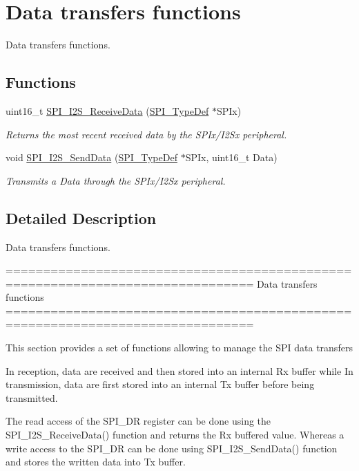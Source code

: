 \hypertarget{group___s_p_i___group2}{}\section{Data transfers functions}
\label{group___s_p_i___group2}


Data transfers functions.  


\subsection*{Functions}
\begin{DoxyCompactItemize}
\item 
uint16\+\_\+t \hyperlink{group___s_p_i___group2_gab77de76547f3bff403236b263b070a30}{S\+P\+I\+\_\+\+I2\+S\+\_\+\+Receive\+Data} (\hyperlink{struct_s_p_i___type_def}{S\+P\+I\+\_\+\+Type\+Def} $\ast$S\+P\+Ix)
\begin{DoxyCompactList}\small\item\em Returns the most recent received data by the S\+P\+Ix/\+I2\+Sx peripheral. \end{DoxyCompactList}\item 
void \hyperlink{group___s_p_i___group2_gad5af40bebe8dbe3fa8bd476489d7e3da}{S\+P\+I\+\_\+\+I2\+S\+\_\+\+Send\+Data} (\hyperlink{struct_s_p_i___type_def}{S\+P\+I\+\_\+\+Type\+Def} $\ast$S\+P\+Ix, uint16\+\_\+t Data)
\begin{DoxyCompactList}\small\item\em Transmits a Data through the S\+P\+Ix/\+I2\+Sx peripheral. \end{DoxyCompactList}\end{DoxyCompactItemize}


\subsection{Detailed Description}
Data transfers functions. 

\begin{DoxyVerb} ===============================================================================
                         Data transfers functions
 ===============================================================================  

  This section provides a set of functions allowing to manage the SPI data transfers
  
  In reception, data are received and then stored into an internal Rx buffer while 
  In transmission, data are first stored into an internal Tx buffer before being 
  transmitted.

  The read access of the SPI_DR register can be done using the SPI_I2S_ReceiveData()
  function and returns the Rx buffered value. Whereas a write access to the SPI_DR 
  can be done using SPI_I2S_SendData() function and stores the written data into 
  Tx buffer.\end{DoxyVerb}
 

